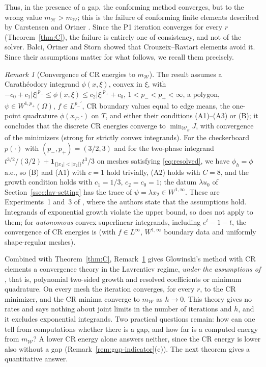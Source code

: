 \documentclass[11pt]{amsart}
\theoremstyle{definition}
\theoremstyle{remark}
\newtheorem{remark}[theorem]{Remark}
\numberwithin{equation}{section}
\newcommand{\abs}[1]{\lvert #1\rvert}
\newcommand{\Wc}{\mathcal W}
\newcommand{\mW}{m_{\mathcal W}}
\newcommand{\mH}{m_{\mathcal H}}
\begin{document}
Thus, in the presence of a gap, the conforming method converges, but to the wrong value $\mH>\mW$; this is the failure of conforming finite elements described by Carstensen and Ortner \cite{CarstensenOrtner2010}. Since the P1 iteration converges for every $r$ (Theorem~\ref{thm:C}), the failure is entirely one of consistency, and not of the solver. Balci, Ortner and Storn \cite{BalciOrtnerStorn2022} showed that Crouzeix--Raviart elements avoid it. Since their assumptions matter for what follows, we recall them precisely.

\begin{remark}[Convergence of CR energies to $\mW$]\label{rem:BOS}
The result \cite[Thm.~1]{BalciOrtnerStorn2022} assumes a Carath\'eodory integrand $\phi(x,\xi)$, convex in $\xi$, with $-c_0+c_1\abs\xi^{p_-}\le\phi(x,\xi)\le c_2\abs\xi^{p_+}+c_0$, $1<p_-<p_+<\infty$, a polygon, $\psi\in W^{1,p_+}(\Omega)$, $f\in L^{p_-'}$, CR boundary values equal to edge means, the one-point quadrature $\phi(x_T,\cdot)$ on $T$, and either their conditions (A1)--(A3) or (B); it concludes that the discrete CR energies converge to $\min_{\Wc_\psi}J$, with convergence of the minimizers (strong for strictly convex integrands). For the checkerboard $p(\cdot)$ with $(p_-,p_+)=(3/2,3)$ and for the two-phase integrand $t^{3/2}/(3/2)+\mathbf 1_{\{\abs{x_1}<\abs{x_2}\}}t^3/3$ on meshes satisfying \eqref{eq:resolved}, we have $\phi_h=\phi$ a.e., so (B) and (A1) with $c=1$ hold trivially, (A2) holds with $C=8$, and the growth condition holds with $c_1=1/3$, $c_2=c_0=1$; the datum $\lambda u_0$ of Section~\ref{ssec:lav-setting} has the trace of $\psi=\lambda x_2\in W^{1,\infty}$. These are Experiments~1 and~3 of \cite{BalciOrtnerStorn2022}, where the authors state that the assumptions hold. Integrands of exponential growth violate the upper bound, so \cite[Thm.~1]{BalciOrtnerStorn2022} does not apply to them; for \emph{autonomous} convex superlinear integrands, including $e^t-1-t$, the convergence of CR energies is \cite[Thm.~4.1]{Ortner2011} (with $f\in L^\infty$, $W^{1,\infty}$ boundary data and uniformly shape-regular meshes).
\end{remark}

Combined with Theorem~\ref{thm:C}, Remark~\ref{rem:BOS} gives Glowinski's method with CR elements a convergence theory in the Lavrentiev regime, \emph{under the assumptions of \cite[Thm.~1]{BalciOrtnerStorn2022}}, that is, polynomial two-sided growth and resolved coefficients or minimum quadrature. On every mesh the iteration converges, for every $r$, to the CR minimizer, and the CR minima converge to $\mW$ as $h\to0$. This theory gives no rates and says nothing about joint limits in the number of iterations and $h$, and it excludes exponential integrands. Two practical questions remain: how can one tell from computations whether there is a gap, and how far is a computed energy from $\mW$? A lower CR energy alone answers neither, since the CR energy is lower also without a gap (Remark~\ref{rem:gap-indicator}(e)). The next theorem gives a quantitative answer.
\end{document}
